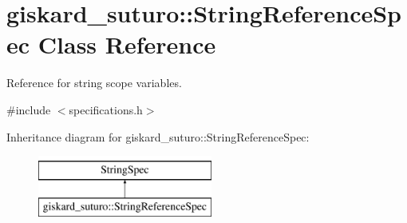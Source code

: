 \hypertarget{classgiskard__suturo_1_1StringReferenceSpec}{\section{giskard\-\_\-suturo\-:\-:String\-Reference\-Spec Class Reference}
\label{classgiskard__suturo_1_1StringReferenceSpec}
}


Reference for string scope variables.  




{\ttfamily \#include $<$specifications.\-h$>$}

Inheritance diagram for giskard\-\_\-suturo\-:\-:String\-Reference\-Spec\-:\begin{figure}[H]
\begin{center}
\leavevmode
\includegraphics[height=2.000000cm]{classgiskard__suturo_1_1StringReferenceSpec}
\end{center}
\end{figure}
